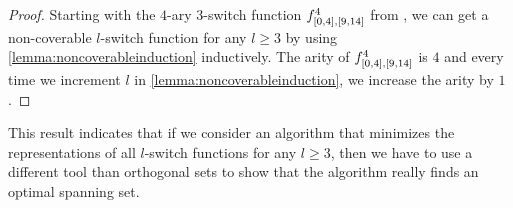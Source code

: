 \begin{proof}
Starting with the $4$-ary
$3$-switch function $f^{4}_{[0, 4], [9, 14]}$ from \citet{Dubovsky2012},
we can get a non-coverable $l$-switch function for any $l \geq 3$
by using \cref{lemma:noncoverableinduction} inductively.
The arity of $f^{4}_{[0, 4], [9, 14]}$ is $4$
and every time we increment $l$ in \cref{lemma:noncoverableinduction},
we increase the arity by $1$.
\end{proof}

This result indicates that
if we consider an algorithm that minimizes the representations of all $l$-switch functions for any $l \geq 3$,
then we have to use a different tool than orthogonal sets to show that the algorithm really finds an optimal spanning set.

